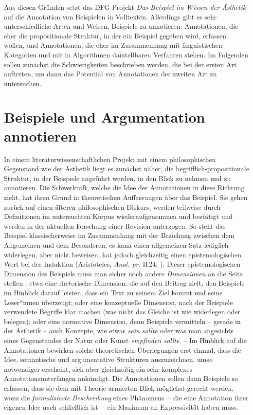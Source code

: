 \documentclass{article}
\renewcommand*{\see}{\autocap{v}gl\adddot}%
\begin{document}
Aus diesen Gründen setzt das DFG-Projekt \textit{Das Beispiel im
  Wissen der Ästhetik} auf die Annotation von Beispielen in
Volltexten. Allerdings gibt es sehr unterschiedliche Arten und Weisen,
Beispiele zu annotieren: Annotationen, die eher die propositionale
Struktur, in der ein Beispiel gegeben wird, erfassen wollen, und
Annotationen, die eher im Zusammenhang mit linguistischen Kategorien
und mit in Algorithmen darstellbaren Verfahren stehen. Im Folgenden
sollen zunächst die Schwierigkeiten beschrieben werden, die bei der
ersten Art auftreten, um dann das Potential von Annotationen der
zweiten Art zu untersuchen.

\section{Beispiele und Argumentation annotieren}


In einem literaturwissenschaftlichen Projekt mit einem philosophischen
Gegenstand wie der Ästhetik liegt es zunächst näher, die
begrifflich-propositionale Struktur, in der Beispiele angeführt
werden, in den Blick zu nehmen und zu annotieren. Die Schwerkraft,
welche die Idee der Annotationen in diese Richtung zieht, hat ihren
Grund in theoretischen Auffassungen über das Beispiel. Sie gehen
zurück auf einen älteren philosophischen Diskurs, werden teilweise
durch Definitionen im untersuchten Korpus wiederaufgenommen und
bestätigt und werden in der aktuellen Forschung einer Revision
unterzogen. So steht das Beispiel klassischerweise im Zusammenhang mit
der Beziehung zwischen dem Allgemeinen und dem Besonderen; es kann
einen allgemeinen Satz lediglich widerlegen, aber nicht beweisen, hat
jedoch gleichzeitig einen epistemologischen Wert bei der Induktion %
(Aristoteles, \emph{Anal. pr.} II\,24; \cite[\see][]{Willer2007a}). %
Dieser epistemologischen Dimension des Beispiels muss man sicher noch
andere \emph{Dimensionen} an die Seite stellen \parencite{CL2013b}:
etwa eine rhetorische Dimension, die auf den Beitrag zielt, den
Beispiele im Hinblick darauf leisten, dass ein Text zu seinem Ziel
kommt und seine Leser*innen überzeugt; oder eine konzeptuelle
Dimension, nach der Beispiele verwendete Begriffe klar machen (was
nicht das Gleiche ist wie widerlegen oder belegen); oder eine
normative Dimension, denn Beispiele vermitteln -- gerade in der
Ästhetik -- auch Konzepte, wie etwas \emph{sein sollte} oder was man
angesichts eines Gegenstandes der Natur oder Kunst \emph{empfinden
  sollte}. -- Im Hinblick auf die Annotationen bewirken solche
theoretischen Überlegungen erst einmal, dass die Idee, semantische und
argumentative Strukturen auszuzeichnen, umso notwendiger erscheint,
sich aber gleichzeitig ein sehr komplexes Annotationsunterfangen
ankündigt. Die Annotationen sollen dann Beispiele so erfassen, dass
sie dem mit Theorie armierten Blick möglichst gerecht werden, wozu die
\emph{formalisierte Beschreibung} eines Phänomens~-- die eine
Annotation ihrer eigenen Idee nach schließlich ist~-- ein Maximum an
Expressivität haben muss.
\end{document}
